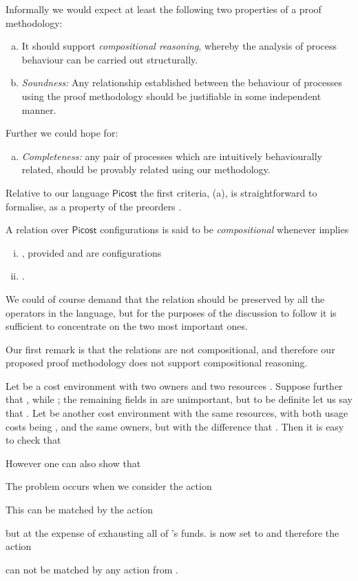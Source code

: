 \documentclass{LMCS}
\newcommand{\pfn}[1]{\mathsf{#1}}  \newcommand{\cfn}[1]{\mathsf{#1}}  \newcommand{\ownfnt}[1]{{\mathsf{#1}}}
\newcommand{\picost}{\ensuremath{\pfn{Picost}}\xspace}
\newcommand{\EndDefBox}{\null\hfill}
\newcommand{\boxHere}{\global\let\EndProof\empty\EndDefBox}
\begin{document}
Informally we would expect at least the following two properties of
a proof methodology:
\begin{enumerate}[(a)]
\item 
It should support \emph{compositional reasoning}, whereby 
the analysis of process behaviour can be carried out structurally.

\item
\emph{Soundness:}
Any relationship established between the behaviour of processes using the proof methodology should be
justifiable in some independent manner.
\end{enumerate}
Further we could hope for:
\begin{enumerate}[(c)]
\item 
\emph{Completeness:} 
any pair of processes which are intuitively behaviourally related, should be provably related
using our methodology. 
\end{enumerate}

Relative to our language \picost the first criteria, (a), is straightforward 
to formalise, as a property of the preorders .

\begin{defi}[Compositional]\label{def:comp}
  A relation  over \picost configurations is said to be 
\emph{compositional} whenever
  implies 
 \begin{enumerate}[(i)]
 \item 

, provided 
 and  are configurations

\item .
\boxHere
\end{enumerate}

\end{defi}
We could of course  demand that  the relation  should be preserved by all
the  operators in the language, but for the purposes of the discussion to follow it is
sufficient to concentrate on the two most important ones. 

Our first remark is that the relations  are not compositional,
and therefore our proposed proof methodology does not support compositional reasoning. 

\begin{exa}\label{ex:noncomp}
  Let  be a cost environment with two owners  and two resources .  Suppose further that , while ; the
  remaining fields in  are unimportant, but to be definite let us
say that  . Let  be
  another cost environment with the same resources, with both usage
  costs being , and the same  owners, but  with the difference that
  .  Then it is easy to check that

However one can also show that

The problem occurs when we consider the 
action

This can be matched by the action

but at the expense of exhausting all of 's funds.  is
now set to  and therefore the action 

can not be matched by any action from
.


\end{exa}
\end{document}
